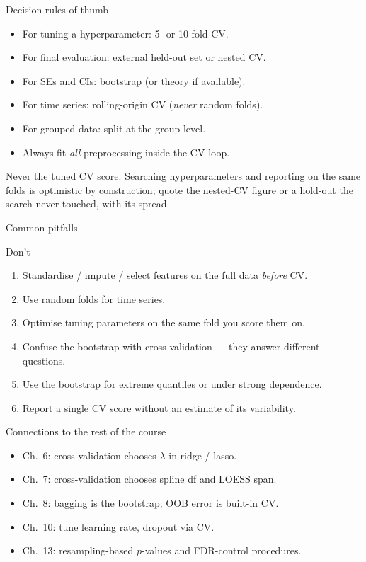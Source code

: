 \documentclass[aspectratio=169,11pt]{beamer}
\begin{document}
\begin{frame}{Decision rules of thumb}
  \begin{itemize}
    \item For tuning a hyperparameter: 5- or 10-fold CV.
    \item For final evaluation: external held-out set or nested CV.
    \item For SEs and CIs: bootstrap (or theory if available).
    \item For time series: rolling-origin CV (\emph{never} random
          folds).
    \item For grouped data: split at the group level.
    \item Always fit \emph{all} preprocessing inside the CV loop.
  \end{itemize}
  \begin{industry}
    Never the tuned CV score. Searching hyperparameters and reporting on
    the same folds is optimistic by construction; quote the nested-CV
    figure or a hold-out the search never touched, with its spread.
  \end{industry}
\end{frame}

\begin{frame}{Common pitfalls}
  \begin{alertblock}{Don't}
    \begin{enumerate}
      \item Standardise / impute / select features on the full data
            \emph{before} CV.
      \item Use random folds for time series.
      \item Optimise tuning parameters on the same fold you score
            them on.
      \item Confuse the bootstrap with cross-validation --- they
            answer different questions.
      \item Use the bootstrap for extreme quantiles or under strong
            dependence.
      \item Report a single CV score without an estimate of its
            variability.
    \end{enumerate}
  \end{alertblock}
\end{frame}

\begin{frame}{Connections to the rest of the course}
  \begin{itemize}
    \item Ch.~6: cross-validation chooses $\lambda$ in ridge / lasso.
    \item Ch.~7: cross-validation chooses spline df and LOESS span.
    \item Ch.~8: bagging is the bootstrap; OOB error is built-in CV.
    \item Ch.~10: tune learning rate, dropout via CV.
    \item Ch.~13: resampling-based $p$-values and FDR-control
          procedures.
  \end{itemize}
\end{frame}
\end{document}
